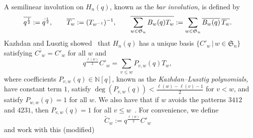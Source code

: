 \documentclass[12pt]{amsart}
\theoremstyle{definition}
\numberwithin{equation}{section}
\newcommand{\sn}{\mathfrak{S}_n}
\newcommand{\qp}[2]{q^{\frac{#1}{#2}}}
\newcommand{\qm}[2]{q^{\negthinspace\Bar\,\frac{#1}{#2}}}
\newcommand{\ol}[1]{\overline{#1}}
\newcommand{\hnq}{H_n(q)}
\newcommand{\wtc}[2]{\widetilde{C}_{#1}}
\newcommand{\defeq}{:=}
\newcommand{\avoidsp}{avoids the patterns $3412$ and $4231${}}
\begin{document}
A semilinear involution on $\hnq$, known as the {\em bar involution}, is defined by
\begin{equation*}
      \ol{\qp12} \defeq \qm12, \qquad \ol{T_w} \defeq (T_{w^{-1}})^{-1}, \qquad
\overline{\sum_{w \in \sn} B_w(q) T_w}
  \defeq \sum_{w \in \sn} \ol{B_w(q)}\, \ol{T_w}.
\end{equation*}
Kazhdan and Lusztig showed~\cite{KLRepCH} that $\hnq$ has a unique
basis $\{ C'_w \,|\, w \in \sn \}$
satisfying 
$\ol{C'_w} = C'_w$ for all $w$
and
\begin{equation}\label{eq:klbasis}
\qp{\ell(w)}2 C'_w = \sum_{v \leq w} P_{v,w}(q) T_w,
\end{equation}
where coefficients $P_{v,w}(q) \in \mathbb N[q]$, known as the {\em Kazhdan--Lusztig polynomials}, have constant term $1$, satisfy
$\deg(P_{v,w}(q)) < \frac{\ell(w) - \ell(v)-1}2$ for $v < w$, 
and satisfy
$P_{w,w}(q) = 1$ for all $w$.
We also have that if
$w$ \avoidsp,
then $P_{v,w}(q) = 1$ for all $v \leq w$~\cite{LakSan}.
For convenience, we define 
\begin{equation}\label{eq: change of basis}
\wtc wq \defeq \qp{\ell(w)}2 C'_w
\end{equation}
and work with this (modified) 
\end{document}

